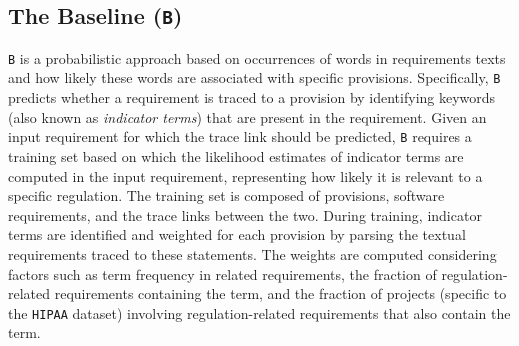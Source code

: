 \subsection{The Baseline (\texttt{B})}
\texttt{B} %
is a probabilistic approach based on occurrences of words in requirements texts and how likely these words are associated with specific provisions. Specifically, \texttt{B} predicts whether a requirement is traced to a provision by identifying keywords (also known as \textit{indicator terms}) that are present in the requirement. %
Given an input requirement for which the trace link should be predicted, \texttt{B} requires a training set based on which the likelihood estimates of indicator terms are computed in the input requirement, representing how likely it is relevant to a specific regulation.
The training set is composed of provisions, software requirements, and the trace links between the two. During training, indicator terms are identified and weighted for each provision by parsing the textual requirements traced to these  statements. %
The weights are computed considering factors such as term frequency in related requirements, the fraction of regulation-related requirements containing the term, and the fraction of projects (specific to the \texttt{HIPAA} dataset) involving regulation-related requirements that also contain the term. 


